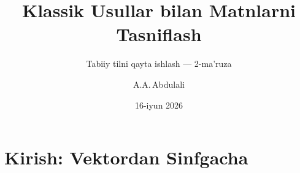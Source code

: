 \documentclass[aspectratio=169,11pt]{beamer}
\title[Klassik Tasnif]{Klassik Usullar bilan Matnlarni Tasniflash}
\subtitle{Tabiiy tilni qayta ishlash --- 2-ma'ruza}
\author[A.A.\,Abdulali]{A.A.\,Abdulali}
\date{16-iyun 2026}
\institute{11:00--12:20 \quad$\cdot$\quad VMQ 425-son, mavzu \textnumero{}2}
\begin{document}

\maketitle

\section[Kirish]{Kirish: Vektordan Sinfgacha}

\end{document}
